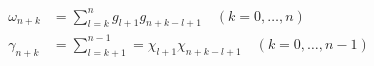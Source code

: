 \begin{equation}
 \begin{split}
  \omega_{n+k} &= \sum \limits_{l=k}^{n} g_{l+1} g_{n+k-l+1} \quad (k=0,\dots,n)\\
  \gamma_{n+k} &= \sum \limits_{l=k+1}^{n-1} =\chi_{l+1} \chi_{n+k-l+1} \quad (k=0,\dots,n-1)
 \end{split}
\end{equation}

